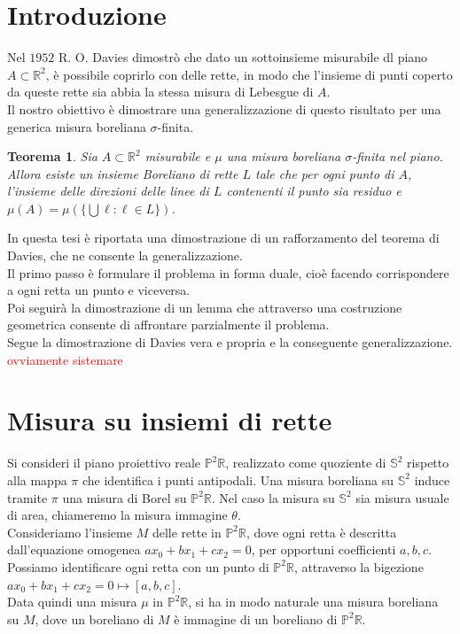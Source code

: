 \documentclass[a4paper, twoside,openright]{article}
\newcommand{\R}{\mathbb{R}}
\renewcommand{\P}{\mathbb{P}}
\renewcommand{\S}{\mathbb{S}}
\newcommand{\<}{\langle}
\renewcommand{\>}{\rangle}
\newtheorem{teo}{Teorema}[]
\begin{document}


\tableofcontents
\clearpage

\section{Introduzione}
	 Nel $1952$ R. O. Davies dimostrò che dato un sottoinsieme misurabile dl piano $A \subset \mathbb{R}^{2}$, è possibile coprirlo con delle rette, in modo che l'insieme di punti coperto da queste rette sia abbia la stessa misura di Lebesgue di $A$.\\
	 Il nostro obiettivo è  dimostrare una generalizzazione di questo risultato per una generica misura boreliana $\sigma$-finita.
\begin{teo}
	Sia $A \subset \mathbb{R}^{2}$ misurabile e $\mu$ una misura boreliana $\sigma$-finita nel piano. Allora esiste un insieme Boreliano di rette $L$ tale che per ogni punto di $A$, l'insieme delle direzioni delle linee di $L$ contenenti il punto sia residuo e $\mu(A)=\mu(\{\bigcup \ell: \ell \in L\})$.
\end{teo} 
	In questa tesi è riportata una dimostrazione di un rafforzamento del teorema di Davies, che ne consente la generalizzazione.\\
	Il primo passo è formulare il problema in forma duale, cioè facendo corrispondere a ogni retta un punto e viceversa.\\
	Poi seguirà la dimostrazione di un lemma che attraverso una costruzione geometrica consente di affrontare parzialmente il problema.\\
	Segue la dimostrazione di Davies vera e propria e la conseguente generalizzazione.\\
	\textcolor{red}{ovviamente sistemare}


\section{Misura su insiemi di rette}

Si consideri il piano proiettivo reale $\P^2 \R$, realizzato come quoziente di $\S^2$ rispetto alla mappa $\pi$ che identifica i punti antipodali. Una misura boreliana su $\S^2$ induce tramite $\pi$ una misura di Borel su $\P^2\R$. Nel caso la misura su $\S^2$ sia misura usuale di area, chiameremo la misura immagine $\theta$.\\
Consideriamo l'insieme $M$ delle rette in $\P^2 \R$, dove ogni retta è descritta dall'equazione omogenea $ax_0+bx_1+cx_2=0$, per opportuni coefficienti $a,b,c$.\\
Possiamo identificare ogni retta con un punto di $\P^2 \R$, attraverso la bigezione $ax_0+bx_1+cx_2=0 \mapsto [a,b,c]$.\\
Data quindi una misura $\mu$ in $\P^2 \R$, si ha in modo naturale una misura boreliana su $M$, dove un boreliano di $M$ è immagine di un boreliano di $\P^2 \R$.
\end{document}
